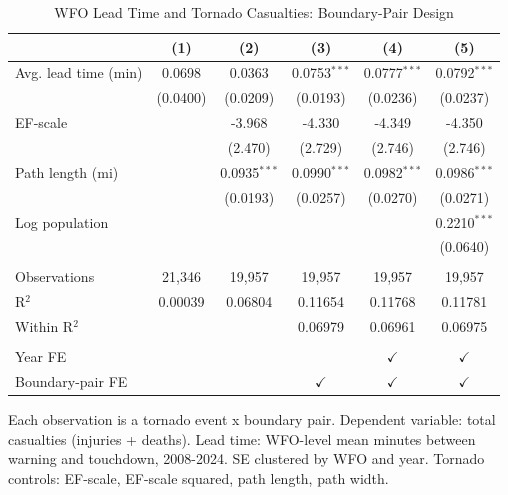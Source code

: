 
\begin{table}[htbp]
   \caption{\label{tab:main} WFO Lead Time and Tornado Casualties: Boundary-Pair Design}
   \bigskip
   \centering
   \begin{tabular}{lccccc}
      \toprule
                           & (1)      & (2)            & (3)            & (4)            & (5)\\  
      \midrule 
      Avg. lead time (min) & 0.0698   & 0.0363         & 0.0753$^{***}$ & 0.0777$^{***}$ & 0.0792$^{***}$\\   
                           & (0.0400) & (0.0209)       & (0.0193)       & (0.0236)       & (0.0237)\\   
      EF-scale             &          & -3.968         & -4.330         & -4.349         & -4.350\\   
                           &          & (2.470)        & (2.729)        & (2.746)        & (2.746)\\   
      Path length (mi)     &          & 0.0935$^{***}$ & 0.0990$^{***}$ & 0.0982$^{***}$ & 0.0986$^{***}$\\   
                           &          & (0.0193)       & (0.0257)       & (0.0270)       & (0.0271)\\   
      Log population       &          &                &                &                & 0.2210$^{***}$\\   
                           &          &                &                &                & (0.0640)\\   
       \\
      Observations         & 21,346   & 19,957         & 19,957         & 19,957         & 19,957\\  
      R$^2$                & 0.00039  & 0.06804        & 0.11654        & 0.11768        & 0.11781\\  
      Within R$^2$         &          &                & 0.06979        & 0.06961        & 0.06975\\  
       \\
      Year FE              &          &                &                & $\checkmark$   & $\checkmark$\\   
      Boundary-pair FE     &          &                & $\checkmark$   & $\checkmark$   & $\checkmark$\\   
      \bottomrule
   \end{tabular}
   
   \par \raggedright 
   Each observation is a tornado event x boundary pair. Dependent variable: total casualties (injuries + deaths). Lead time: WFO-level mean minutes between warning and touchdown, 2008-2024. SE clustered by WFO and year. Tornado controls: EF-scale, EF-scale squared, path length, path width.
\end{table}


